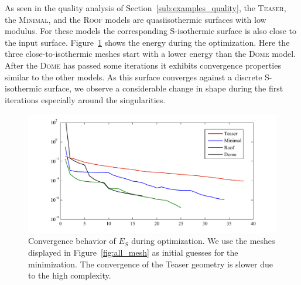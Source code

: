 \documentclass[twoside]{article}
\begin{document}
As seen in the quality analysis of Section~\ref{sub:examples_quality}, the
\textsc{Teaser}, the \textsc{Minimal}, and the \textsc{Roof} models are
quasiisothermic surfaces with low modulus. For these models the corresponding S-isothermic
surface is also close to the input surface. Figure~\ref{fig:convergence} shows
the energy during the optimization. Here the three close-to-isothermic meshes
start with a lower energy than the \textsc{Dome} model. After the \textsc{Dome}
has passed some iterations it exhibits convergence properties similar to the
other models. As this surface converges against a discrete S-isothermic surface,
we observe a considerable change in shape during the first iterations
especially around the singularities.

\begin{figure}[tb]
\centering
\includegraphics[width=0.7\linewidth]{../data/convergence_plots_embedded.pdf}
\caption{Convergence behavior of $E_S$ during optimization. We use the meshes 
displayed in Figure~\ref{fig:all_mesh} as initial guesses for the minimization. The
convergence of the Teaser geometry is slower due to the high complexity.}
\label{fig:convergence}
\end{figure}

\end{document}
